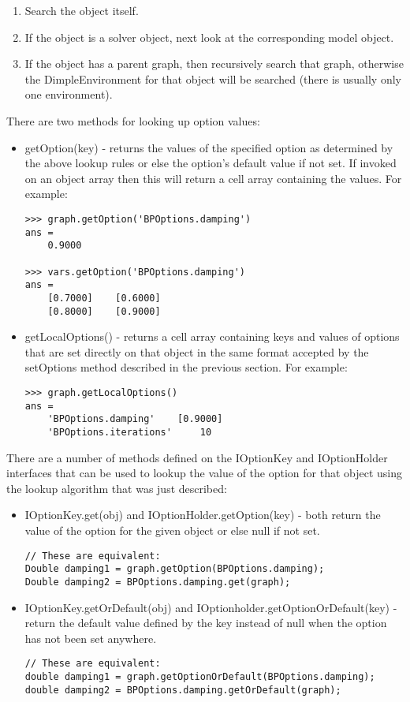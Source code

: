 \begin{enumerate}
\item Search the object itself.
\item If the object is a solver object, next look at the corresponding model object.
\item If the object has a parent graph, then recursively search that graph,
otherwise the DimpleEnvironment for that object will be searched (there is usually only one environment).
\end{enumerate}

\ifmatlab
There are two methods for looking up option values:

\begin{itemize}
\item getOption(key) - returns the values of the specified option as determined by the above lookup rules or else the option's default value if not set. If invoked on an object array then this will return a cell array containing the values. For example:
\begin{lstlisting}
>>> graph.getOption('BPOptions.damping')
ans =
    0.9000
    
>>> vars.getOption('BPOptions.damping')
ans =
    [0.7000]    [0.6000]
    [0.8000]    [0.9000]
\end{lstlisting}

\item getLocalOptions() - returns a cell array containing keys and values of options that are set directly on that object in the same format accepted by the setOptions method described in the previous section. For example:
\begin{lstlisting}
>>> graph.getLocalOptions()
ans =
    'BPOptions.damping'    [0.9000]
    'BPOptions.iterations'     10
\end{lstlisting}
\end{itemize}
\fi %

\ifjava
There are a number of methods defined on the IOptionKey and IOptionHolder interfaces that can be used to lookup the value of the option for that object using the lookup algorithm that was just described:

\begin{itemize}
\item IOptionKey.get(obj) and IOptionHolder.getOption(key) - both return the value of the option for the given object or else null if not set.
\begin{lstlisting}
// These are equivalent:
Double damping1 = graph.getOption(BPOptions.damping);
Double damping2 = BPOptions.damping.get(graph);
\end{lstlisting}
\item IOptionKey.getOrDefault(obj) and IOptionholder.getOptionOrDefault(key) - return the default value defined by the key instead of null when the option has not been set anywhere.
\begin{lstlisting}
// These are equivalent:
double damping1 = graph.getOptionOrDefault(BPOptions.damping);
double damping2 = BPOptions.damping.getOrDefault(graph);
\end{lstlisting}
\end{itemize}

